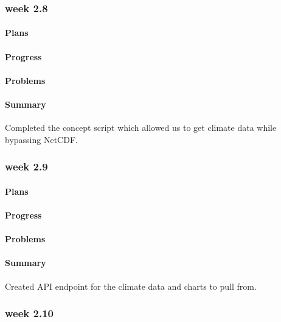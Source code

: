 \documentclass[onecolumn, draftclsnofoot,10pt, compsoc]{article}
\begin{document}
		\subsubsection{week 2.8}
			\paragraph{Plans} \hfill \break

			\paragraph{Progress} \hfill \break

			\paragraph{Problems} \hfill \break

			\paragraph{Summary} \hfill \break
			    Completed the concept script which allowed us to get climate data while bypassing NetCDF.

		\subsubsection{week 2.9}
			\paragraph{Plans} \hfill \break

			\paragraph{Progress} \hfill \break

			\paragraph{Problems} \hfill \break 
			
			\paragraph{Summary} \hfill \break 
                Created API endpoint for the climate data and charts to pull from.

		\subsubsection{week 2.10}
\end{document}
